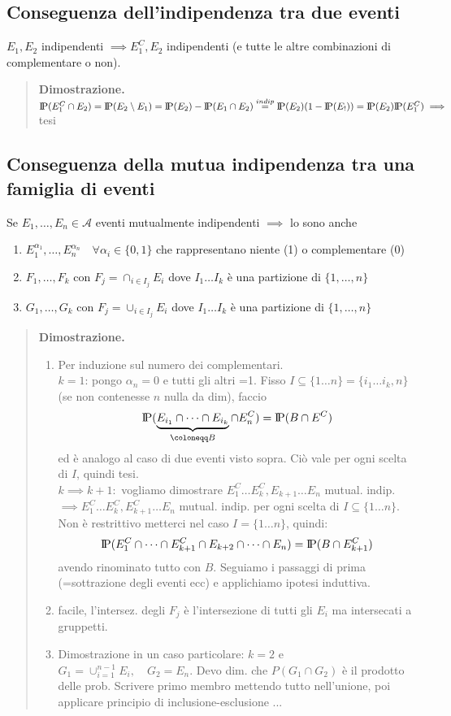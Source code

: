 \documentclass[a4paper,10pt]{article}
\newcommand{\pr}{\text{I\kern-0.15em P}} %
\theoremstyle{remark}
\theoremstyle{definition}
\newenvironment{dimo}{\begin{quote}\textbf{Dimostrazione.}}{\end{quote}} %
\begin{document}
\subsection*{Conseguenza dell'indipendenza tra due eventi}
$E_1,E_2$ indipendenti $\implies E_1^C,E_2$ indipendenti (e tutte le altre combinazioni di complementare o non).

\begin{dimo}
    $\pr( E_1^C\cap E_2)=\pr(E_2\setminus E_1)=\pr(E_2)-\pr(E_1\cap E_2)\overset{indip}{=}\pr(E_2)(1-\pr(E_!))=\pr(E_2)\pr(E_1^C) \implies $ tesi
\end{dimo}

\subsection*{Conseguenza della mutua indipendenza tra una famiglia di eventi}
Se $E_1, \dots,E_n\in\mathcal{A}$ eventi mutualmente indipendenti $\implies$ lo sono anche
\begin{enumerate}
    \item $E_1^{\alpha_1}, \dots,E_n^{\alpha_n} \quad \forall \alpha_i \in \{0,1\}$ che rappresentano niente (1) o complementare (0)
    \item $F_1,\dots,F_k$ con $F_j=\cap_{i \in I_j}E_i$ dove $I_1 \dots I_k$ è una partizione di $\{1,\dots,n\}$
    \item $G_1,\dots,G_k$ con $F_j=\cup_{i \in I_j}E_i$ dove $I_1 \dots I_k$ è una partizione di $\{1,\dots,n\}$
\end{enumerate}

\begin{dimo}
    \begin{enumerate}
        \item Per induzione sul numero dei complementari. \\
        $k=1$: pongo $\alpha_n=0$ e tutti gli altri =1. Fisso $I\subseteq \{1\dots n\} =\{i_1 \dots i_k,n\}$ (se non contenesse $n$ nulla da dim), faccio $$\pr(\underbrace{E_{i_1}\cap \dots \cap E_{i_k}}_{\coloneqq B}\cap E_n^C)=\pr(B\cap E^C)$$
        ed è analogo al caso di due eventi visto sopra. Ciò vale per ogni scelta di $I$, quindi tesi. \\
        $k \implies k+1:$ vogliamo dimostrare $E_1^C \dots E_k^C,E_{k+1}\dots E_n$ mutual. indip. $\implies E_1^C \dots E_k^C,E_{k+1}^C\dots E_n$ mutual. indip. per ogni scelta di $I\subseteq \{1\dots n\}$. Non è restrittivo metterci nel caso $I= \{1\dots n\}$, quindi:
        $$\pr(E_1^C\cap\dots\cap E_{k+1}^C\cap E_{k+2}\cap\dots\cap E_n)=\pr(B\cap E_{k+1}^C)$$
        avendo rinominato tutto con $B$. Seguiamo i passaggi di prima (=sottrazione degli eventi ecc) e applichiamo ipotesi induttiva.
        \item facile, l'intersez. degli $F_j$ è l'intersezione di tutti gli $E_i$ ma intersecati a gruppetti.
        \item Dimostrazione in un caso particolare: $k=2$ e $G_1=\cup_{i=1}^{n-1}E_i, \quad G_2=E_n$. Devo dim. che $P(G_1\cap G_2)$ è il prodotto delle prob. Scrivere primo membro mettendo tutto nell'unione, poi applicare principio di inclusione-esclusione ...
    \end{enumerate}
\end{dimo}
\end{document}

